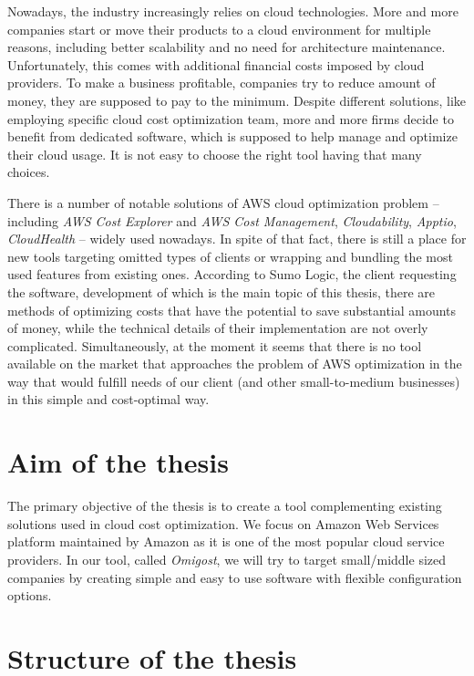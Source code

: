 \documentclass[licencjacka,en]{thesisclass}
\begin{document}
    Nowadays, the industry increasingly relies on cloud technologies.
    More and more companies start or move their products to a cloud environment
    for multiple reasons, including better scalability
    and no need for architecture maintenance.
    Unfortunately, this comes with additional financial costs imposed by cloud providers.
    To make a business profitable, companies try
    to reduce amount of money, they are supposed to pay to the minimum.
    Despite different solutions, like employing specific
    cloud cost optimization team, more and more firms decide
    to benefit from dedicated software, which is supposed to help
    manage and optimize their cloud usage.
    It is not easy to choose the right tool having that many choices.

    There is a number of notable solutions of AWS cloud optimization
    problem -- including \textit{AWS Cost Explorer} and \textit{AWS Cost Management},
    \textit{Cloudability}, \textit{Apptio}, \textit{CloudHealth} -- widely used nowadays.
    In spite of that fact, there is still a place for new tools targeting
    omitted types of clients or wrapping and bundling the most used features from existing ones.
    According to Sumo Logic, the client requesting the software,
    development of which is the main topic of this thesis, there are methods of optimizing costs
    that have the potential to save substantial amounts of money, while the technical details
    of their implementation are not overly complicated.
    Simultaneously, at the moment it seems that there is
    no tool available on the market that approaches the problem
    of AWS optimization in the way that would fulfill
    needs of our client (and other small-to-medium businesses)
    in this simple and cost-optimal way.

    \section{Aim of the thesis}

    The primary objective of the thesis is to create a tool
    complementing existing solutions used in cloud cost optimization.
    We focus on Amazon Web Services platform maintained by Amazon
    as it is one of the most popular cloud service providers.
    In our tool, called \textit{Omigost}, we will try to target small/middle
    sized companies by creating simple and easy to use software
    with flexible configuration options.

    \section{Structure of the thesis}
\end{document}
